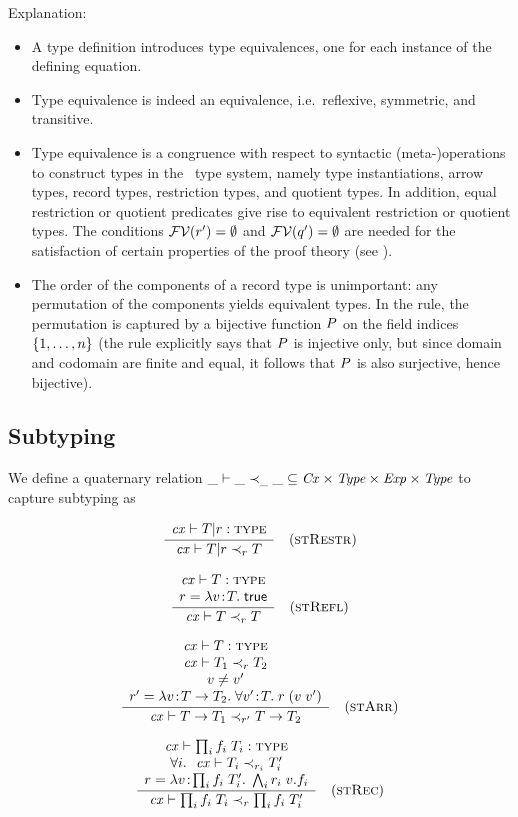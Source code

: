 Explanation:
\begin{itemize}
\item
A type definition introduces type equivalences, one for each instance of the
defining equation.
\item
Type equivalence is indeed an equivalence, i.e.\ reflexive, symmetric, and
transitive.
\item
Type equivalence is a congruence with respect to syntactic (meta-)operations
to construct types in the \MS\ type system, namely type instantiations, arrow
types, record types, restriction types, and quotient types. In addition, equal
restriction or quotient predicates give rise to equivalent restriction or
quotient types. The conditions $\mathcal{FV}(r')=\emptyset$ and
$\mathcal{FV}(q')=\emptyset$ are needed for the satisfaction of certain
properties of the proof theory (see ).
\item
The order of the components of a record type is unimportant: any permutation
of the components yields equivalent types. In the rule, the permutation is
captured by a bijective function $P$ on the field indices $\{1,\ldots,n\}$
(the rule explicitly says that $P$ is injective only, but since domain and
codomain are finite and equal, it follows that $P$ is also surjective,
hence bijective).
\end{itemize}

\subsection{Subtyping}

We define a quaternary relation $\_\vdash\_\prec_{\_}\_\subseteq\mathit{Cx}\times\mathit{Type}\times\mathit{Exp}\times\mathit{Type}$ to
capture subtyping as

\[
\frac{\begin{array}{c}\mathit{cx}\vdash T|r:\textsc{type}\end{array}}{\mathit{cx}\vdash T|r\prec_{r}T}\quad\mbox{(\textsc{stRestr})}
\]

\[
\frac{\begin{array}{c}\mathit{cx}\vdash T:\textsc{type}\\r=\lambda v\!:\!T.\;\mathsf{true}\end{array}}{\mathit{cx}\vdash T\prec_{r}T}\quad\mbox{(\textsc{stRefl})}
\]

\[
\frac{\begin{array}{c}\mathit{cx}\vdash T:\textsc{type}\\\mathit{cx}\vdash T_1\prec_{r}T_2\\v\neq v'\\r'=\lambda v\!:\!T\to T_2.\;\forall v'\!:\!T.\;r\;(v\;v')\end{array}}{\mathit{cx}\vdash T\to T_1\prec_{r'}T\to T_2}\quad\mbox{(\textsc{stArr})}
\]

\[
\frac{\begin{array}{c}\mathit{cx}\vdash\prod_{i}f_i\;T_i:\textsc{type}\\\forall i.\ \ \mathit{cx}\vdash T_i\prec_{r_i}T_i'\\r=\lambda v\!:\!\prod_{i}f_i\;T_i'.\;\bigwedge_{i}r_i\;v.f_i\end{array}}{\mathit{cx}\vdash\prod_{i}f_i\;T_i\prec_{r}\prod_{i}f_i\;T_i'}\quad\mbox{(\textsc{stRec})}
\]

